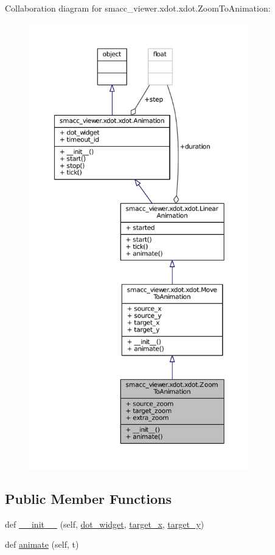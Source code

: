 Collaboration diagram for smacc\+\_\+viewer.\+xdot.\+xdot.\+Zoom\+To\+Animation\+:
\nopagebreak
\begin{figure}[H]
\begin{center}
\leavevmode
\includegraphics[height=550pt]{classsmacc__viewer_1_1xdot_1_1xdot_1_1ZoomToAnimation__coll__graph}
\end{center}
\end{figure}
\subsection*{Public Member Functions}
\begin{DoxyCompactItemize}
\item 
def \hyperlink{classsmacc__viewer_1_1xdot_1_1xdot_1_1ZoomToAnimation_a2c6dc0e3f10e930403e1e15b1ffa113b}{\+\_\+\+\_\+init\+\_\+\+\_\+} (self, \hyperlink{classsmacc__viewer_1_1xdot_1_1xdot_1_1Animation_a0fca25f51eb80a7ba49233a0729ab955}{dot\+\_\+widget}, \hyperlink{classsmacc__viewer_1_1xdot_1_1xdot_1_1MoveToAnimation_a5ea1e33ebe1d6ab9bfa86a336b3a2524}{target\+\_\+x}, \hyperlink{classsmacc__viewer_1_1xdot_1_1xdot_1_1MoveToAnimation_af354769fa237bb3f62cf02d9ca92da4f}{target\+\_\+y})
\item 
def \hyperlink{classsmacc__viewer_1_1xdot_1_1xdot_1_1ZoomToAnimation_a43c4560411e399a15fcd3476f26e7d02}{animate} (self, t)
\end{DoxyCompactItemize}
